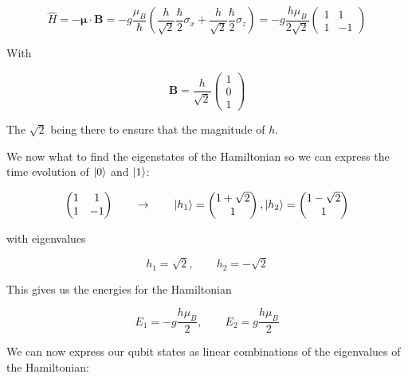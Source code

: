 \documentclass[a4paper,norsk, 10pt]{article}
\begin{document}
\begin{equation}
\hat{H} = -\mathbf{\mu}\cdot \mathbf{B} = - g\frac{\mu_B}{\hbar}\left(\frac{h}{\sqrt{2}}\frac{\hbar}{2}\sigma_x + \frac{h}{\sqrt{2}}\frac{\hbar}{2}\sigma_z\right) = -g\frac{h\mu_B}{2\sqrt{2}}
\begin{pmatrix}
1 & 1 \\
1 & -1
\end{pmatrix}
\end{equation}

With

\begin{equation}
\mathbf{B} = \frac{h}{\sqrt{2}}
\begin{pmatrix}
1 \\ 0 \\ 1
\end{pmatrix}
\end{equation}

The $\sqrt{2}$ being there to ensure that the magnitude of $h$. 

We now what to find the eigenstates of the Hamiltonian so we can express the time evolution of $\ket{0}$ and $\ket{1}$:

\begin{equation}
\begin{pmatrix}
1 & 1 \\
1 & -1
\end{pmatrix}
\qquad
\rightarrow
\qquad
\ket{h_1} = 
\begin{pmatrix}
1 + \sqrt{2} \\ 1
\end{pmatrix},
\ket{h_2} = 
\begin{pmatrix}
1 - \sqrt{2} \\ 1
\end{pmatrix}
\end{equation}

with eigenvalues

\begin{equation}
h_1 = \sqrt{2},\qquad h_2  = -\sqrt{2}
\end{equation}

This gives us the energies for the Hamiltonian

\begin{equation}
E_1 = -g\frac{h\mu_B}{2}, \qquad E_2 = g\frac{h\mu_B}{2}
\end{equation}

We can now express our qubit states as linear combinations of the eigenvalues of the Hamiltonian:
\end{document}
